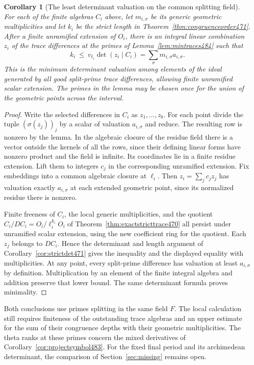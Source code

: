 \documentclass[a4paper,11pt]{article}
\newtheorem{corollary}[proposition]{Corollary}
\theoremstyle{definition}
\theoremstyle{remark}
\numberwithin{equation}{section}
\begin{document}
\begin{corollary}[The least determinant valuation on the common splitting field]\leavevmode
\label{cor:strictmindet484}
For each of the finite algebras \(C_i\) above, let \(m_{i,\sigma}\)
be its generic geometric multiplicities and let \(k_i\) be the
strict length in Theorem~\ref{thm:congruenceorder471}.
After a finite unramified extension of \(O_i\), there is an
integral linear combination \(z_i\) of the trace differences
at the primes of Lemma~\ref{lem:mintraces484} such that
\[
    k_i\ \le\ v_{\ell_i}\det(z_i\mid C_i)
           =\sum_\sigma m_{i,\sigma}a_{i,\sigma}.
\]
This is the minimum determinant valuation among elements of the
ideal generated by all good split-prime trace differences, allowing
finite unramified scalar extension. The primes in the lemma may
be chosen once for the union of the geometric points across
the interval.
\end{corollary}
\begin{proof}
Write the selected differences in \(C_i\) as \(z_1,\ldots,z_b\).
For each point divide the tuple \((\sigma(z_j))_j\) by
a scalar of valuation \(a_{i,\sigma}\) and reduce. The resulting
row is nonzero by the lemma. In the algebraic closure of the
residue field there is a vector outside the kernels of all the
rows, since their defining linear forms have nonzero product and the
field is infinite. Its coordinates lie in a finite residue
extension. Lift them to integers \(c_j\) in the corresponding
unramified extension. Fix embeddings into a common algebraic
closure at \(\ell_i\). Then \(z_i=\sum_j c_jz_j\) has valuation
exactly \(a_{i,\sigma}\) at each extended geometric point, since
its normalized residue there is nonzero.

Finite freeness of \(C_i\), the local generic multiplicities, and
the quotient \(C_i/DC_i=O_i/\ell_i^{k_i}O_i\) of
Theorem~\ref{thm:exactstricttrace470} all persist under unramified
scalar extension, using the new coefficient ring for the quotient.
Each \(z_j\) belongs to \(DC_i\). Hence the determinant and
length argument of Corollary~\ref{cor:strictdet471} gives the
inequality and the displayed equality with multiplicities.
At any point, every split-prime difference has valuation at
least \(a_{i,\sigma}\) by definition. Multiplication by an
element of the finite integral algebra and addition preserve
that lower bound. The same determinant formula proves minimality.
\end{proof}

Both conclusions use primes splitting in the same field \(F\).
The local calculation still requires finiteness of the outstanding
trace algebras and an upper estimate for the sum of their congruence
depths with their geometric multiplicities. The theta ranks
at these primes concern the mixed derivatives of
Corollary~\ref{cor:projectsymbol483}. For the fixed final period
and its archimedean determinant, the comparison of
Section~\ref{sec:missing} remains open.
\end{document}
